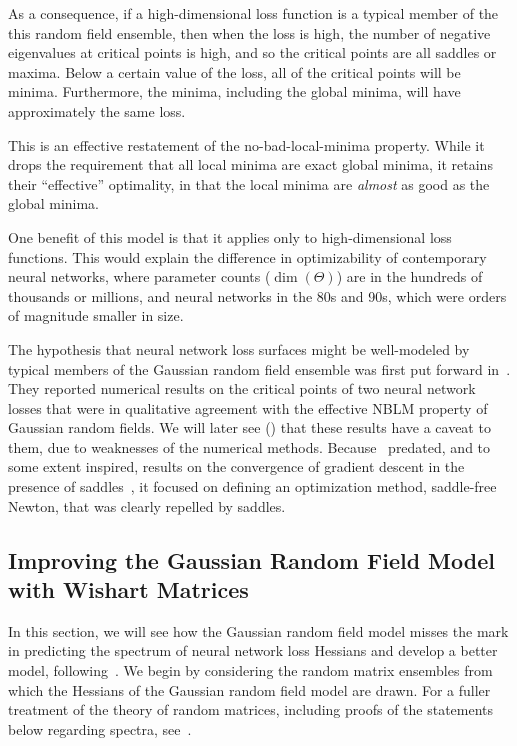\documentclass[../../thesis.tex]{subfiles}
\begin{document}
As a consequence, if a high-dimensional loss function is a typical member of the
this random field ensemble, then
when the loss is high,
the number of negative eigenvalues at critical points is high,
and so the critical points are all saddles or maxima.
Below a certain value of the loss,
all of the critical points will be minima.
Furthermore,
the minima, including the global minima,
will have approximately the same loss.

This is an effective restatement
of the no-bad-local-minima property.
While it drops the requirement that all local minima are
exact global minima,
it retains their \enquote{effective} optimality,
in that the local minima are \emph{almost} as good
as the global minima.

One benefit of this model is that it
applies only to high-dimensional loss functions.
This would explain the difference in optimizability
of contemporary neural networks,
where parameter counts ($\dim\left(\Theta\right)$)
are in the hundreds of thousands or millions,
and neural networks in the 80s and 90s,
which were orders of magnitude smaller in size.

The hypothesis that neural network loss surfaces
might be well-modeled by typical members
of the Gaussian random field ensemble
was first put forward in~\cite{dauphin2014}.
They reported numerical results on the critical points
of two neural network losses that were in qualitative
agreement with the effective NBLM property
of Gaussian random fields.
We will later see ()
that these results have a caveat to them,
due to weaknesses of the numerical methods.
Because~\cite{dauphin2014} predated,
and to some extent inspired,
results on the convergence of gradient descent
in the presence of saddles~\cite{lee2016,jin2018a},
it focused on defining an optimization method,
saddle-free Newton,
that was clearly repelled by saddles.

\subsection{Improving the Gaussian Random Field Model with Wishart Matrices}

In this section, we will see
how the Gaussian random field model misses the mark
in predicting the spectrum of neural network loss Hessians
and develop a better model, following~\cite{pennington2017}.
We begin by considering the random matrix ensembles
from which the Hessians of the Gaussian random field model
are drawn.
For a fuller treatment of the theory of random matrices,
including proofs of the statements below regarding spectra,
see~\cite{feier2012,tao2012}.
\end{document}
